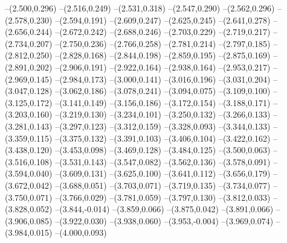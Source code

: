 {--(2.500,0.296)
--(2.516,0.249)
--(2.531,0.318)
--(2.547,0.290)
--(2.562,0.296)
--(2.578,0.230)
--(2.594,0.191)
--(2.609,0.247)
--(2.625,0.245)
--(2.641,0.278)
--(2.656,0.244)
--(2.672,0.242)
--(2.688,0.246)
--(2.703,0.229)
--(2.719,0.217)
--(2.734,0.207)
--(2.750,0.236)
--(2.766,0.258)
--(2.781,0.214)
--(2.797,0.185)
--(2.812,0.250)
--(2.828,0.168)
--(2.844,0.198)
--(2.859,0.195)
--(2.875,0.169)
--(2.891,0.202)
--(2.906,0.191)
--(2.922,0.164)
--(2.938,0.164)
--(2.953,0.217)
--(2.969,0.145)
--(2.984,0.173)
--(3.000,0.141)
--(3.016,0.196)
--(3.031,0.204)
--(3.047,0.128)
--(3.062,0.186)
--(3.078,0.241)
--(3.094,0.075)
--(3.109,0.100)
--(3.125,0.172)
--(3.141,0.149)
--(3.156,0.186)
--(3.172,0.154)
--(3.188,0.171)
--(3.203,0.160)
--(3.219,0.130)
--(3.234,0.101)
--(3.250,0.132)
--(3.266,0.133)
--(3.281,0.143)
--(3.297,0.123)
--(3.312,0.159)
--(3.328,0.093)
--(3.344,0.133)
--(3.359,0.115)
--(3.375,0.132)
--(3.391,0.103)
--(3.406,0.104)
--(3.422,0.162)
--(3.438,0.120)
--(3.453,0.098)
--(3.469,0.128)
--(3.484,0.125)
--(3.500,0.063)
--(3.516,0.108)
--(3.531,0.143)
--(3.547,0.082)
--(3.562,0.136)
--(3.578,0.091)
--(3.594,0.040)
--(3.609,0.131)
--(3.625,0.100)
--(3.641,0.112)
--(3.656,0.179)
--(3.672,0.042)
--(3.688,0.051)
--(3.703,0.071)
--(3.719,0.135)
--(3.734,0.077)
--(3.750,0.071)
--(3.766,0.029)
--(3.781,0.059)
--(3.797,0.130)
--(3.812,0.033)
--(3.828,0.052)
--(3.844,-0.014)
--(3.859,0.066)
--(3.875,0.042)
--(3.891,0.066)
--(3.906,0.085)
--(3.922,0.030)
--(3.938,0.060)
--(3.953,-0.004)
--(3.969,0.074)
--(3.984,0.015)
--(4.000,0.093)
}
